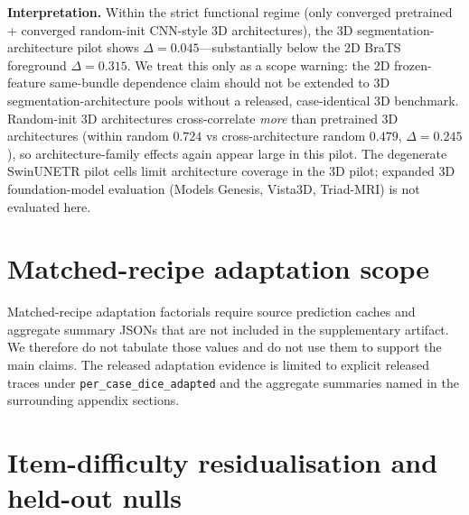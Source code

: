 \textbf{Interpretation.} Within the strict functional regime (only converged pretrained + converged random-init CNN-style 3D architectures), the 3D segmentation-architecture pilot shows $\Delta{=}0.045$---substantially below the 2D BraTS foreground $\Delta{=}0.315$. We treat this only as a scope warning: the 2D frozen-feature same-bundle dependence claim should not be extended to 3D segmentation-architecture pools without a released, case-identical 3D benchmark. Random-init 3D architectures cross-correlate \emph{more} than pretrained 3D architectures (within random $0.724$ vs cross-architecture random $0.479$, $\Delta{=}0.245$), so architecture-family effects again appear large in this pilot. The degenerate SwinUNETR pilot cells limit architecture coverage in the 3D pilot; expanded 3D foundation-model evaluation (Models Genesis, Vista3D, Triad-MRI) is not evaluated here.

\section{Matched-recipe adaptation scope}
\label{app:matched-recipe}
\label{app:matched-recipe-acdc}

Matched-recipe adaptation factorials require source prediction caches and aggregate summary JSONs that are not included in the supplementary artifact. We therefore do not tabulate those values and do not use them to support the main claims. The released adaptation evidence is limited to explicit released traces under \texttt{per\_case\_dice\_adapted} and the aggregate summaries named in the surrounding appendix sections.


\section{Item-difficulty residualisation and held-out nulls}
\label{app:diffleak}

